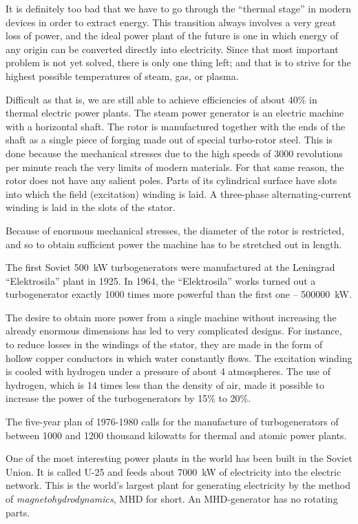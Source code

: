 It is definitely too bad that we have to go through the ``thermal stage'' in modern devices in order to extract energy. This transition always involves a very great loss of power, and the ideal power plant of the future is one in which energy of any origin can be converted directly into electricity. Since that most important problem is not yet solved, there is only one thing left; and that is to strive for the highest possible temperatures of steam, gas, or plasma.

Difficult as that is, we are still able to achieve efficiencies of about 40\% in thermal electric power plants. The steam power generator is an electric machine with a horizontal shaft. The rotor is manufactured together with the ends of the shaft as a single piece of forging made out of special turbo-rotor steel. This is done because the mechanical stresses due to the high speeds of 3000 revolutions per minute reach the very limits of modern materials. For that same reason, the rotor does not have any salient poles. Parts of its cylindrical surface have slots into which the field (excitation) winding is laid. A three-phase alternating-current winding is laid in the slots of the stator.

Because of enormous mechanical stresses, the diameter of the rotor is restricted, and so to obtain sufficient power the machine has to be stretched out in length.

The first Soviet \SI{500}{\kilo\watt} turbogenerators were man­ufactured at the Leningrad ``Elektrosila'' plant in 1925. In 1964, the ``Elektrosila'' works turned out a turbogen­erator exactly 1000 times more powerful than the first one -- \SI{500000}{\kilo\watt}.

The desire to obtain more power from a single machine without increasing the already enormous dimensions has led to very complicated designs. For instance, to reduce losses in the windings of the stator, they are made in the form of hollow copper conductors in which water constant­ly flows. The excitation winding is cooled with hydrogen under a pressure of about 4 atmospheres. The use of hydrogen, which is 14 times less than the density of air, made it possible to increase the power of the turbogen­erators by 15\% to 20\%.

The five-year plan of 1976-1980 calls for the manufac­ture of turbogenerators of between 1000 and 1200 thousand kilowatts for thermal and atomic power plants.

One of the most interesting power plants in the world has been built in the Soviet Union. It is called U-25 and feeds about \SI{7000}{\kilo\watt} of electricity into the electric network. This is the world's largest plant for generating electricity by the method of \emph{magnetohydrodynamics}, MHD for short. An MHD-generator has no rotating parts.

